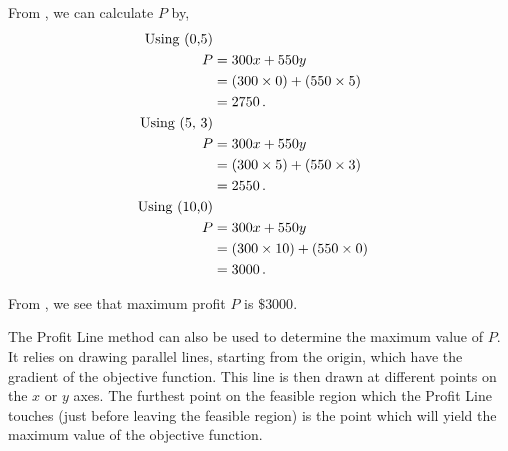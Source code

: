 \begin{subquestions}

\subquestion

From , we can calculate $P$ by,
\begin{align}
	\text{Using (0,5)}  \nonumber \\
	P & = 300x + 550y  \nonumber \\
	& = (300 \times 0) + (550 \times 5)  \nonumber \\
	& = 2750 \,.  \\
	\text{Using (5, 3)}  \nonumber \\
	P & = 300x + 550y  \nonumber \\
	& = (300 \times 5) + (550 \times 3)  \nonumber \\
	& = 2550 \,.    \\		  
	\text{Using (10,0)}  \nonumber \\
	P & = 300x + 550y  \nonumber \\
	& = (300 \times 10) + (550 \times 0)  \nonumber \\
	& = 3000 \,. \label{2005:q2:eqn:Profit}
\end{align}

From , we see that maximum profit $P$ is $ \$ 3000$.


\subquestion

The Profit Line method can also be used to determine the maximum value of $P$. It relies on drawing parallel lines, starting from the origin, which have the gradient of the objective function. This line is then drawn at different points on the $x$ or $y$ axes. The furthest point on the feasible region which the Profit Line touches (just before leaving the feasible region) is the point which will yield the maximum value of the objective function. 

\end{subquestions}

